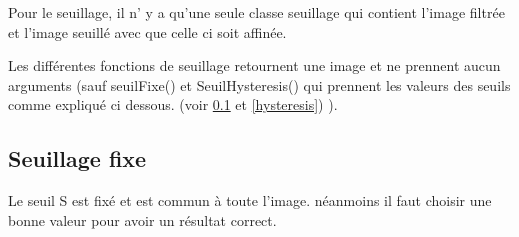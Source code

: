\documentclass[11pt]{article}
\begin{document}
	Pour le seuillage, il n' y a qu'une seule classe seuillage qui contient l'image filtrée et l'image seuillé avec que celle ci soit affinée.

	Les différentes fonctions de seuillage retournent une image et ne prennent aucun arguments (sauf seuilFixe() et SeuilHysteresis() qui prennent les valeurs des seuils comme expliqué ci dessous. (voir \ref{fixe} et \ref{hysteresis}) ).

	\subsection{Seuillage fixe}\label{fixe}

	Le seuil S est fixé et est commun à toute l'image. néanmoins il faut choisir une bonne valeur pour avoir un résultat correct.
\end{document}
